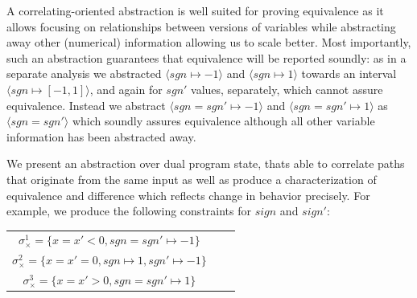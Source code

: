 A correlating-oriented abstraction is well suited for proving equivalence as it allows focusing on relationships between versions of variables while abstracting away other (numerical) information allowing us to scale better. Most importantly, such an abstraction guarantees that equivalence will be reported soundly: as in a separate analysis we abstracted $\langle sgn \mapsto -1 \rangle$ and $\langle sgn \mapsto 1 \rangle$ towards an interval $\langle sgn \mapsto [-1,1] \rangle$, and again for $sgn'$ values, separately, which cannot assure equivalence. Instead we abstract $\langle sgn = sgn' \mapsto -1 \rangle$ and $\langle sgn = sgn' \mapsto 1 \rangle$ as $\langle sgn = sgn' \rangle$ which soundly assures equivalence although all other variable information has been abstracted away.


We present an abstraction over dual program state, thats able to correlate paths that originate from the same input as well as produce a characterization of equivalence and difference which reflects change in behavior precisely. For example, we produce the following constraints for $sign$ and $sign'$:
\\
\begin{tabular}{ccc}
$\sigma_{\times}^1 = \{x = x' < 0, sgn = sgn' \mapsto -1\}$
\\
$\sigma_{\times}^2 = \{x = x' = 0, sgn \mapsto 1, sgn' \mapsto -1\}$
\\
$\sigma_{\times}^3 = \{x = x' > 0, sgn = sgn' \mapsto 1\}$
\\
\end{tabular}
\\

